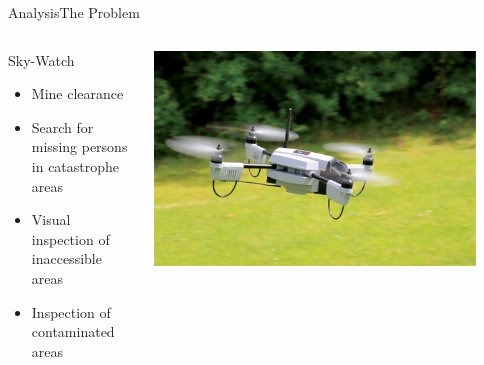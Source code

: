 \begin{frame}{Analysis}{The Problem}
    \begin{columns}[T]
        \begin{column}{.5\textwidth}
            \begin{block}{Sky-Watch}
                \begin{itemize}
                    \item Mine clearance
                    \item Search for missing persons in catastrophe areas
                    \item Visual inspection of inaccessible areas
                    \item Inspection of contaminated areas
                \end{itemize}
            \end{block}
        \end{column}
        \begin{column}{.5\textwidth}
            \includegraphics[width=0.9\textwidth]{images/sky-watch_drone.jpg}
        \end{column}
    \end{columns}
\end{frame}

